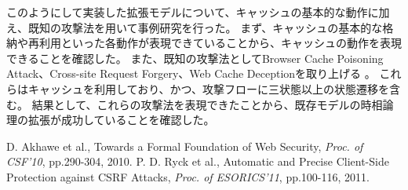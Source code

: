 \documentclass[a4paper]{jarticle}
\begin{document}
このようにして実装した拡張モデルについて、キャッシュの基本的な動作に加え、既知の攻撃法を用いて事例研究を行った。
まず、キャッシュの基本的な格納や再利用といった各動作が表現できていることから、キャッシュの動作を表現できることを確認した。
また、既知の攻撃法としてBrowser Cache Poisoning Attack、Cross-site Request Forgery、Web Cache Deceptionを取り上げる
。
これらはキャッシュを利用しており、かつ、攻撃フローに三状態以上の状態遷移を含む。
結果として、これらの攻撃法を表現できたことから、既存モデルの時相論理の拡張が成功していることを確認した。

\begin{thebibliography}{9}
 D. Akhawe et al., Towards a Formal Foundation of Web Security, \textit{Proc. of CSF'10}, pp.290-304, 2010.
 P. D. Ryck et al., Automatic and Precise Client-Side Protection against CSRF Attacks, \textit{Proc. of ESORICS'11}, pp.100-116, 2011.
\end{thebibliography}
\end{document}

